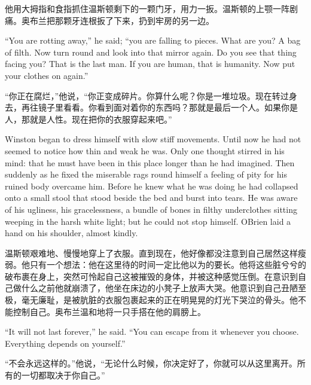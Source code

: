 \begin{paracol}{2}
\switchcolumn

他用大拇指和食指抓住温斯顿剩下的一颗门牙，用力一扳。温斯顿的上颚一阵剧痛。奥布兰把那颗牙连根扳了下来，扔到牢房的另一边。

\switchcolumn*

``You are rotting away,'' he said; ``you are falling to pieces. What are
you? A bag of filth. Now turn round and look into that mirror again. Do
you see that thing facing you? That is the last man. If you are human,
that is humanity. Now put your clothes on again.''

\switchcolumn

``你正在腐烂，''他说，``你正变成碎片。你算什么呢？你是一堆垃圾。现在转过身去，再往镜子里看看。你看到面对着你的东西吗？那就是最后一个人。如果你是人，那就是人性。现在把你的衣服穿起来吧。''

\switchcolumn*

Winston began to dress himself with slow stiff movements. Until now he
had not seemed to notice how thin and weak he was. Only one thought
stirred in his mind: that he must have been in this place longer than he
had imagined. Then suddenly as he fixed the miserable rags round himself
a feeling of pity for his ruined body overcame him. Before he knew what
he was doing he had collapsed onto a small stool that stood beside the
bed and burst into tears. He was aware of his ugliness, his
gracelessness, a bundle of bones in filthy underclothes sitting weeping
in the harsh white light; but he could not stop himself.
O\textquotesingle Brien laid a hand on his shoulder, almost kindly.

\switchcolumn

温斯顿艰难地、慢慢地穿上了衣服。直到现在，他好像都没注意到自己居然这样瘦弱。他只有一个想法：他在这里待的时间一定比他以为的要长。他将这些脏兮兮的破布裹在身上，突然可怜起自己这被摧毁的身体，并被这种感觉压倒。在意识到自己做什么之前他就崩溃了，他坐在床边的小凳子上放声大哭。他意识到自己丑陋至极，毫无廉耻，是被肮脏的衣服包裹起来的正在明晃晃的灯光下哭泣的骨头。他不能控制自己。奥布兰温和地将一只手搭在他的肩膀上。

\switchcolumn*

``It will not last forever,'' he said. ``You can escape from it whenever
you choose. Everything depends on yourself.''

\switchcolumn

``不会永远这样的。''他说，``无论什么时候，你决定好了，你就可以从这里离开。所有的一切都取决于你自己。''

\switchcolumn*


\end{paracol}
